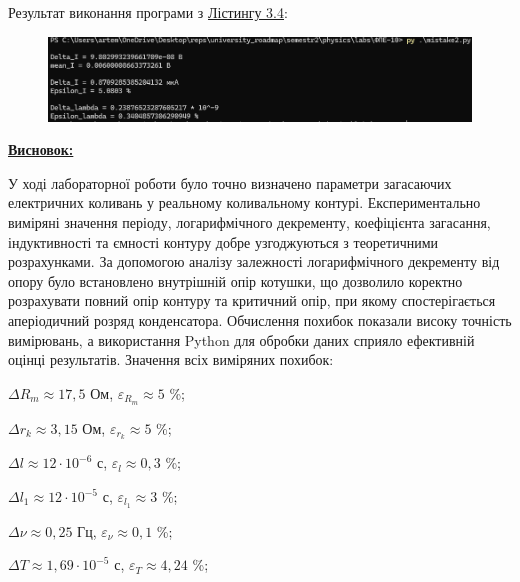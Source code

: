 \documentclass[12pt,a4paper]{article}
\begin{document}
    \newpage

    \setlength{\parindent}{0pt}

    Результат виконання програми з \hyperlink{listing4}{Лістингу 3.4}:

    \begin{figure}[ht]
        \includegraphics[width=1\textwidth]{mistake2_photo.png}
    \end{figure}

    \vspace{3em}

    \underline{\textbf{\large Висновок:}}

    \vspace{1em}

    У ході лабораторної роботи було точно визначено параметри загасаючих електричних коливань у реальному коливальному контурі.
    Експериментально виміряні значення періоду, логарифмічного декременту, коефіцієнта загасання, індуктивності та
    ємності контуру добре узгоджуються з теоретичними розрахунками. За допомогою аналізу залежності логарифмічного
    декременту від опору було встановлено внутрішній опір котушки, що дозволило коректно розрахувати повний опір контуру
    та критичний опір, при якому спостерігається аперіодичний розряд конденсатора.
    Обчислення похибок показали високу точність вимірювань,
    а використання Python для обробки даних сприяло ефективній оцінці результатів. Значення всіх виміряних похибок:

    \vspace{1em}

    $\Delta R_m \approx 17,5$ Ом, $\varepsilon_{R_m} \approx 5$ \%;

    $\Delta r_k \approx 3,15$ Ом, $\varepsilon_{r_k} \approx 5$ \%;

    $\Delta l \approx 12 \cdot 10^{-6}$ с, $\varepsilon_l \approx 0,3$ \%;

    $\Delta l_1 \approx 12 \cdot 10^{-5}$ с, $\varepsilon_{l_1} \approx 3$ \%;

    $\Delta \nu \approx 0,25$ Гц, $\varepsilon_{\nu} \approx 0,1$ \%;

    $\Delta T \approx 1,69 \cdot 10^{-5}$ с, $\varepsilon_T \approx 4,24$ \%;
\end{document}

